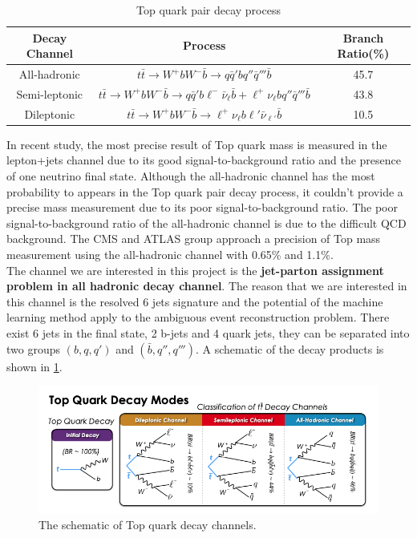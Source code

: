 \begin{center}
\begin{table}[h]
\begin{tabular}{ c c c}
	\cline{1-3}
	Decay Channel    & Process & Branch Ratio(\%) \\
	\hline
	All-hadronic      & $t\bar{t}\to W^{+}bW^{-}\bar{b}\to q\bar{q}'bq''\bar{q}'''\bar{b}$    & 45.7     \\
	Semi-leptonic       &   $t\bar{t}\to W^{+}bW^{-}\bar{b}\to q\bar{q}'b\ell^{-}\bar{\nu}_{\ell}\bar{b} + \ell^{+}\nu_{\ell}bq''\bar{q}'''\bar{b}$   & 43.8     \\
	Dileptonic      &   $t\bar{t}\to W^{+}bW^{-}\bar{b}\to \ell^{+}\nu_{\ell}b\ell'\bar{\nu}_{\ell'}\bar{b}$   & 10.5      \\
	\hline
\end{tabular}
\caption{Top quark pair decay process\cite{Zyla:2020zbs}}
\label{table:Branchratio}
\end{table}
\end{center}
In recent study, the most precise result of Top quark mass is measured in the lepton+jets channel due to its good signal-to-background ratio and the presence of one neutrino final state. Although the all-hadronic channel has the most probability to appears in the Top quark pair decay process, it couldn't provide a precise mass measurement due to its poor signal-to-background ratio. The poor signal-to-background ratio of the all-hadronic channel is due to the difficult QCD background. The CMS and ATLAS group approach a precision of Top mass measurement using the all-hadronic channel with 0.65\% and 1.1\%.\cite{Sirunyan:2018mlv}\cite{Aaboud:2017mae} 
\\
\newline
The channel we are interested in this project is the \textbf{jet-parton assignment problem in all hadronic decay channel}. The reason that we are interested in this channel is the resolved 6 jets signature and the potential of the machine learning method apply to the ambiguous event reconstruction problem. There exist 6 jets in the final state, 2 b-jets and 4 quark jets, they can be separated into two groups $\left(b, q, q'\right)$ and $\left(\bar{b}, q'', q'''\right)$. A schematic of the decay products is shown in \ref{fig:ttbardecaymode}. 
\begin{figure}[h]
	\centering
	\includegraphics[width=0.8\linewidth]{Figures/ttbar-decay-mode.png}
	\caption{The schematic of Top quark decay channels.\cite{Mccarthy:2015ucy}}
	\label{fig:ttbardecaymode}
\end{figure}
